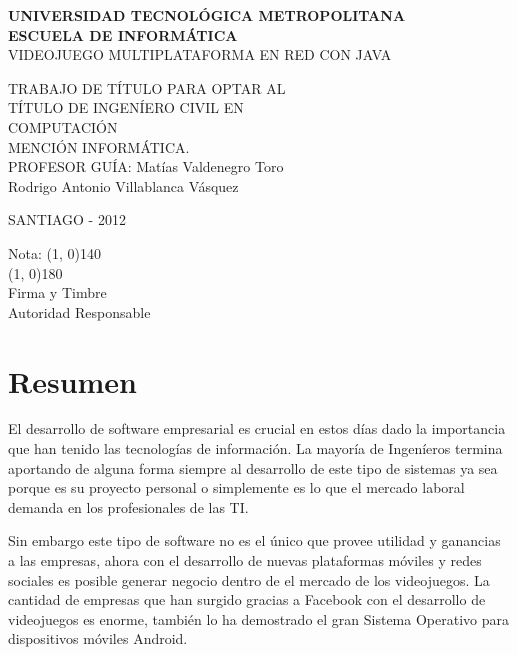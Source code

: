 \documentclass[a4paper,12pt,openany,oneside]{book}
\begin{document}
\thispagestyle{empty}
\begin{center}
\textbf{UNIVERSIDAD TECNOLÓGICA METROPOLITANA\\
ESCUELA DE INFORMÁTICA}\\
\vspace{3cm}
VIDEOJUEGO MULTIPLATAFORMA EN RED CON JAVA
\end{center}
\begin{flushright}
TRABAJO DE TÍTULO PARA OPTAR AL\\
TÍTULO DE INGENÍERO CIVIL EN\\
COMPUTACIÓN\\
MENCIÓN INFORMÁTICA.\\
\vspace{3cm}
PROFESOR GUÍA: Matías Valdenegro Toro\\
\vspace{1.5cm}
Rodrigo Antonio Villablanca Vásquez
\end{flushright}
\vspace{4cm}
\begin{center}
SANTIAGO - 2012
\end{center}
\newpage
\thispagestyle{empty}
\begin{flushright}
\vspace{20mm}
Nota: \line(1, 0){140} \\
\vspace{30 mm}
\line(1, 0){180}\\
Firma y Timbre\\
Autoridad Responsable
\end{flushright}
\chapter*{Resumen}
\thispagestyle{empty}
El desarrollo de software empresarial es crucial en estos días dado la importancia que han tenido las tecnologías de información. La mayoría de Ingeníeros termina aportando de alguna forma siempre al desarrollo de este tipo de sistemas ya sea porque es su proyecto personal o simplemente es lo que el mercado laboral demanda en los profesionales de las TI.

Sin embargo este tipo de software no es el único que provee utilidad y ganancias a las empresas, ahora con el desarrollo de nuevas plataformas móviles y redes sociales es posible generar negocio dentro de el mercado de los videojuegos. La cantidad de empresas que han surgido gracias a Facebook con el desarrollo de videojuegos es enorme, también lo ha demostrado el gran Sistema Operativo para dispositivos móviles Android.
\end{document}
